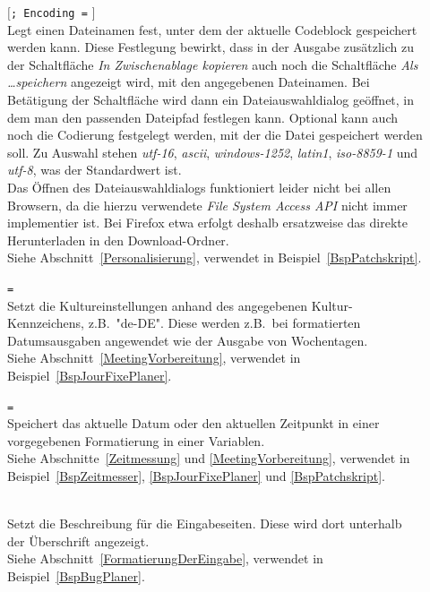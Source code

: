 \begin{description}
\item[]  $[ $\verb|; Encoding =|  $]$\\
Legt einen Dateinamen fest, unter dem der aktuelle Codeblock gespeichert werden kann. Diese Festlegung bewirkt, dass in der Ausgabe zusätzlich zu der Schaltfläche \emph{In Zwischenablage kopieren} auch noch die Schaltfläche \emph{Als \dots speichern} angezeigt wird, mit den angegebenen Dateinamen. Bei Betätigung der Schaltfläche wird dann ein Dateiauswahldialog geöffnet, in dem man den passenden Dateipfad festlegen kann. Optional kann auch noch die Codierung festgelegt werden, mit der die Datei gespeichert werden soll. Zu Auswahl stehen \emph{utf-16}, \emph{ascii}, \emph{windows-1252}, \emph{latin1}, \emph{iso-8859-1} und \emph{utf-8}, was der Standardwert ist. \\
Das Öffnen des Dateiauswahldialogs funktioniert leider nicht bei allen Browsern, da die hierzu verwendete \emph{File System Access API} nicht immer implementier ist. Bei Firefox etwa erfolgt deshalb ersatzweise das direkte Herunterladen in den Download-Ordner.\\
Siehe Abschnitt~\ref{Personalisierung}, verwendet in Beispiel~\ref{BspPatchskript}.

\item[]  \verb|=| \\
Setzt die Kultureinstellungen anhand des angegebenen Kultur-Kennzeichens, z.B.\ "de-DE". Diese werden z.B.\ bei formatierten Datumsausgaben angewendet wie der Ausgabe von Wochentagen.\\
Siehe Abschnitt~\ref{MeetingVorbereitung}, verwendet in Beispiel~\ref{BspJourFixePlaner}.

\item[]  \verb|=| \\
Speichert das aktuelle Datum oder den aktuellen Zeitpunkt in einer vorgegebenen Formatierung in einer Variablen.\\
Siehe Abschnitte~\ref{Zeitmessung} und \ref{MeetingVorbereitung}, verwendet in Beispiel~\ref{BspZeitmesser}, \ref{BspJourFixePlaner} und \ref{BspPatchskript}.

\item[] \\
Setzt die Beschreibung für die Eingabeseiten. Diese wird dort unterhalb der Überschrift angezeigt.\\
Siehe Abschnitt~\ref{FormatierungDerEingabe}, verwendet in Beispiel~\ref{BspBugPlaner}.


\end{description}
